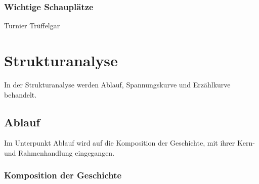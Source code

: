 \subsubsection{Wichtige Schauplätze}
Turnier
Trüffelgar	
	
\section{Strukturanalyse}
In der Strukturanalyse werden Ablauf, Spannungskurve und Erzählkurve behandelt.

\subsection{Ablauf}
Im Unterpunkt Ablauf wird auf die Komposition der Geschichte, mit ihrer Kern- und Rahmenhandlung eingegangen.

\subsubsection{Komposition der Geschichte}

